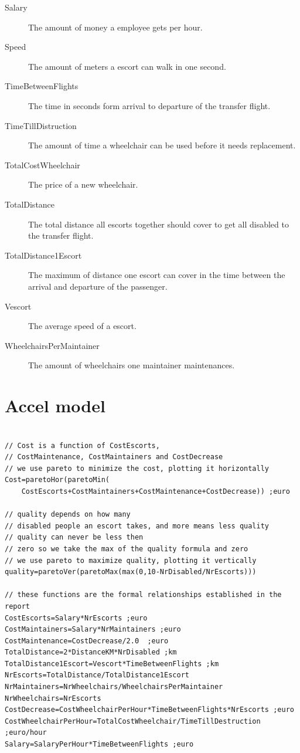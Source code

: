 \documentclass[a4paper, 11pt, notitlepage]{report}
\begin{document}
\begin{appendices}
\begin{description}
  \item[Salary] The amount of money a employee gets per hour.
  \item[Speed] The amount of meters a escort can walk in one second.
  \item[TimeBetweenFlights] The time in seconds form arrival to departure of the transfer flight.
  \item[TimeTillDistruction] The amount of time a wheelchair can be used before it needs replacement.
  \item[TotalCostWheelchair] The price of a new wheelchair.
  \item[TotalDistance] The total distance all escorts together should cover to get all disabled to the transfer flight.
  \item[TotalDistance1Escort] The maximum of distance one escort can cover in the time between the arrival and departure of the passenger.
  \item[Vescort] The average speed of a escort.
  \item[WheelchairsPerMaintainer] The amount of wheelchairs one maintainer maintenances.
\end{description}

\listoffigures

\chapter{Accel model}
\begin{lstlisting}
	 
// Cost is a function of CostEscorts, 
// CostMaintenance, CostMaintainers and CostDecrease
// we use pareto to minimize the cost, plotting it horizontally
Cost=paretoHor(paretoMin(
	CostEscorts+CostMaintainers+CostMaintenance+CostDecrease)) ;euro

// quality depends on how many 
// disabled people an escort takes, and more means less quality
// quality can never be less then 
// zero so we take the max of the quality formula and zero
// we use pareto to maximize quality, plotting it vertically
quality=paretoVer(paretoMax(max(0,10-NrDisabled/NrEscorts)))

// these functions are the formal relationships established in the report
CostEscorts=Salary*NrEscorts ;euro
CostMaintainers=Salary*NrMaintainers ;euro
CostMaintenance=CostDecrease/2.0  ;euro
TotalDistance=2*DistanceKM*NrDisabled ;km
TotalDistance1Escort=Vescort*TimeBetweenFlights ;km
NrEscorts=TotalDistance/TotalDistance1Escort 
NrMaintainers=NrWheelchairs/WheelchairsPerMaintainer 
NrWheelchairs=NrEscorts 
CostDecrease=CostWheelchairPerHour*TimeBetweenFlights*NrEscorts ;euro 
CostWheelchairPerHour=TotalCostWheelchair/TimeTillDestruction ;euro/hour
Salary=SalaryPerHour*TimeBetweenFlights ;euro


\end{lstlisting}
\end{appendices}
\end{document}
